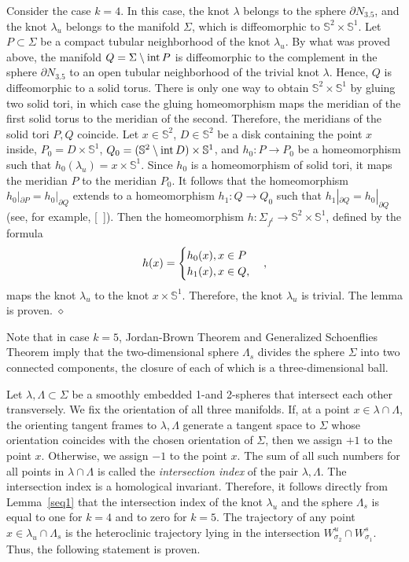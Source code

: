 \documentclass[%
 aip,
 amsmath,amssymb,
preprint,%
]{revtex4-1}
\newenvironment{proof}{{\bf Proof:}}
{\hfill $\diamond$\medskip}
\begin{document}
\begin{proof}
Consider the case $k=4$. In this case, the knot $\lambda$ belongs to the sphere $\partial N_{3.5}$, and the knot $\lambda_u$ belongs to the manifold $\Sigma$, which is diffeomorphic to $\mathbb S^2\times \mathbb S^1$. Let $P\subset \Sigma$ be a compact tubular neighborhood of the knot $\lambda_u$. By what was proved above, the manifold $Q=\Sigma\setminus {\rm int}\,P$ is diffeomorphic to the complement in the sphere $\partial N_{3.5}$ to an open tubular neighborhood of the trivial knot $\lambda$. Hence, $Q$ is diffeomorphic to a solid torus. There is only one way to obtain $\mathbb S^2\times \mathbb S^1$ by gluing two solid tori, in which case the gluing homeomorphism maps the meridian of the first solid torus to the meridian of the second. Therefore, the meridians of the solid tori $P, Q$ coincide. Let $x\in \mathbb S^2$, $D\in \mathbb S^2$ be a disk containing the point $x$ inside, $P_0=D\times \mathbb S^1$, $Q_0=(\mathbb S^2\setminus {\rm int}\, D)\times \mathbb S^1$, and $h_0: P\to P_0$ be a homeomorphism such that $h_0(\lambda_u)=x\times \mathbb S^1$. Since $h_0$ is a homeomorphism of solid tori, it maps the meridian $P$ to the meridian $P_0$. It follows that the homeomorphism $h_0|_{\partial P}=h_0|_{\partial Q}$ extends to a homeomorphism $h_1: Q\to Q_0$ such that $h_1|_{\partial Q}=h_0|_{\partial Q}$ (see, for example, [~]). Then the homeomorphism $h: \Sigma_{f^t}\to \mathbb S^2\times \mathbb S^1$, defined by the formula
$$h(x)=\begin{cases}h_0(x), x\in P\cr h_1(x), x\in Q, \end{cases},$$ maps the knot $\lambda_u$ to the knot $x\times \mathbb S^1$. Therefore, the knot $\lambda_u$ is trivial. The lemma is proven.
\end{proof}

Note that in case $k=5$,  Jordan-Brown Theorem and Generalized Schoenflies Theorem imply that the two-dimensional sphere $\Lambda_s$ divides the sphere $\Sigma$ into two connected components, the closure of each of which is a three-dimensional ball.

Let $\lambda, \Lambda\subset \Sigma$ be a smoothly embedded 1-and 2-spheres that  intersect each other transversely. We fix the orientation of all three manifolds. If, at a point $x\in \lambda\cap \Lambda$, the orienting tangent frames to $\lambda, \Lambda$ generate a tangent space to $\Sigma$ whose orientation coincides with the chosen orientation of $\Sigma$, then we assign $+1$ to the point $x$. Otherwise, we assign $-1$ to the point $x$. The sum of all such numbers for all points in $\lambda\cap \Lambda$ is called the {\it intersection index} of the pair $\lambda, \Lambda$. The intersection index is a homological invariant. Therefore, it follows directly from Lemma~\ref{seq1} that the intersection index of the knot $\lambda_u$ and the sphere $\Lambda_s$ is equal to one for $k=4$ and  to zero for $k=5$. The trajectory of any point $x\in \lambda_u\cap \Lambda_s$ is the heteroclinic trajectory lying in the intersection $W^u_{\sigma_2}\cap W^s_{\sigma_1}$. Thus, the following statement is proven.
\end{document}
